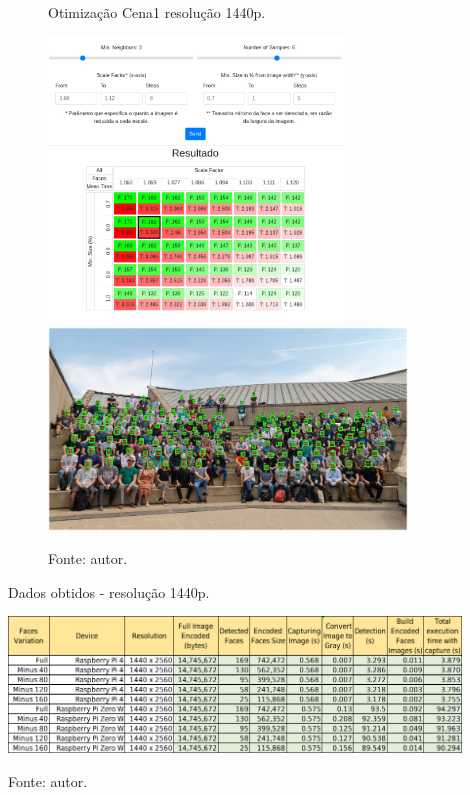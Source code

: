 \begin{figure}[H]
    \centering
    \caption[Otimização Cena 1 - resolução 1440p.]{Otimização Cena1 resolução 1440p.}
    \includegraphics[width=0.70\textwidth]{Cap4_Experimentos_Realizados/Figures/cena1_param_1440p_matriz.jpg}
    \includegraphics[width=0.85\textwidth]{Cap4_Experimentos_Realizados/Figures/cena1_param_1440p_faces.jpg}
    \caption*{Fonte: autor.}
    \label{fig:otimizacaoCena1_1440p}
\end{figure}
    
\begin{table}
    \centering
    \caption[Dados obtidos - resolução 1440p.]{Dados obtidos - resolução 1440p.}
    \includegraphics[width=0.90\textwidth]{Cap4_Experimentos_Realizados/Figures/cena1_dados_1440p.jpg}
    \caption*{Fonte: autor.}
    \label{fig:dadosCena1_1440p}
\end{table}

